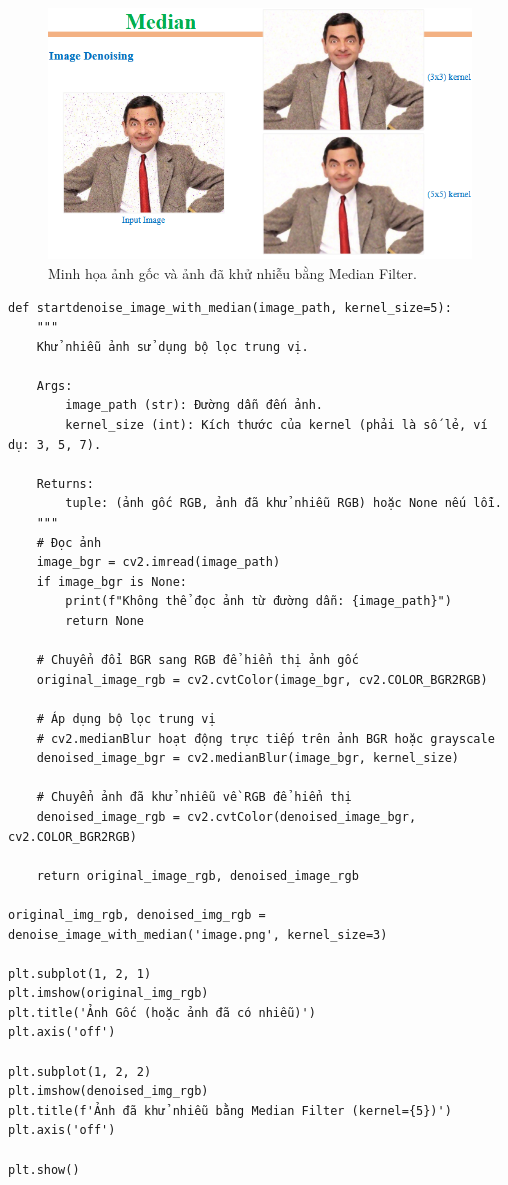 \documentclass[11pt]{article}
\begin{document}
\begin{figure}[H]
    \centering
    \includegraphics[width=0.9\linewidth]{images/median_noise.png} %
    \caption{Minh họa ảnh gốc và ảnh đã khử nhiễu bằng Median Filter.}
\end{figure}

\begin{verbatim}
def startdenoise_image_with_median(image_path, kernel_size=5):
    """
    Khử nhiễu ảnh sử dụng bộ lọc trung vị.

    Args:
        image_path (str): Đường dẫn đến ảnh.
        kernel_size (int): Kích thước của kernel (phải là số lẻ, ví dụ: 3, 5, 7).

    Returns:
        tuple: (ảnh gốc RGB, ảnh đã khử nhiễu RGB) hoặc None nếu lỗi.
    """
    # Đọc ảnh
    image_bgr = cv2.imread(image_path)
    if image_bgr is None:
        print(f"Không thể đọc ảnh từ đường dẫn: {image_path}")
        return None

    # Chuyển đổi BGR sang RGB để hiển thị ảnh gốc
    original_image_rgb = cv2.cvtColor(image_bgr, cv2.COLOR_BGR2RGB)

    # Áp dụng bộ lọc trung vị
    # cv2.medianBlur hoạt động trực tiếp trên ảnh BGR hoặc grayscale
    denoised_image_bgr = cv2.medianBlur(image_bgr, kernel_size)

    # Chuyển ảnh đã khử nhiễu về RGB để hiển thị
    denoised_image_rgb = cv2.cvtColor(denoised_image_bgr, cv2.COLOR_BGR2RGB)

    return original_image_rgb, denoised_image_rgb

original_img_rgb, denoised_img_rgb = denoise_image_with_median('image.png', kernel_size=3)
 
plt.subplot(1, 2, 1)
plt.imshow(original_img_rgb)
plt.title('Ảnh Gốc (hoặc ảnh đã có nhiễu)')
plt.axis('off')

plt.subplot(1, 2, 2)
plt.imshow(denoised_img_rgb)
plt.title(f'Ảnh đã khử nhiễu bằng Median Filter (kernel={5})')
plt.axis('off')

plt.show()
\end{verbatim} \\ 
\end{document}
